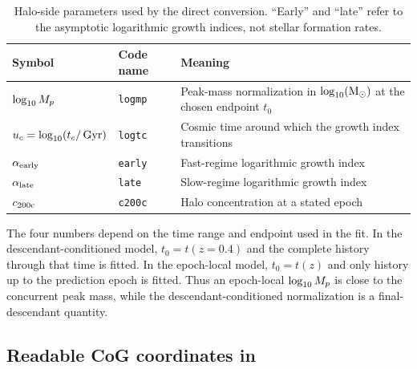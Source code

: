 \begin{table}[htbp]
  \centering
  \caption{Halo-side parameters used by the direct conversion. ``Early'' and
  ``late'' refer to the asymptotic logarithmic growth indices, not stellar
  formation rates.}
  \label{tab:halo_parameters}
  \begin{tabularx}{\textwidth}{@{}l l X@{}}
    \toprule
    Symbol & Code name & Meaning \\
    \midrule
    $\log_{10} M_p$ & \texttt{logmp} & Peak-mass normalization in $\log_{10}(\mathrm{M}_{\odot})$ at the chosen endpoint $t_0$ \\
    $u_c=\log_{10}(t_c/\,\mathrm{Gyr})$ & \texttt{logtc} & Cosmic time around which the growth index transitions \\
    $\alpha_{\rm early}$ & \texttt{early} & Fast-regime logarithmic growth index \\
    $\alpha_{\rm late}$ & \texttt{late} & Slow-regime logarithmic growth index \\
    $c_{200\mathrm{c}}$ & \texttt{c200c} & Halo concentration at a stated epoch \\
    \bottomrule
  \end{tabularx}
\end{table}

The four numbers depend on the time range and endpoint used in the fit. In the
descendant-conditioned model, $t_0=t(z=0.4)$ and the complete history through
that time is fitted. In the epoch-local model, $t_0=t(z)$ and only history up to
the prediction epoch is fitted. Thus an epoch-local $\log_{10} M_p$ is close to
the concurrent peak mass, while the descendant-conditioned normalization is a
final-descendant quantity.

\subsection{Readable CoG coordinates in \ExpFifty{}}
\label{sec:exp50_coordinates}

